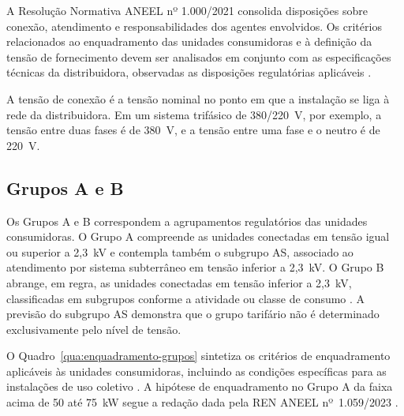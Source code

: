 A Resolução Normativa ANEEL nº 1.000/2021 consolida disposições sobre conexão, atendimento e responsabilidades dos agentes envolvidos. Os critérios relacionados ao enquadramento das unidades consumidoras e à definição da tensão de fornecimento devem ser analisados em conjunto com as especificações técnicas da distribuidora, observadas as disposições regulatórias aplicáveis \cite[arts.~23 e~24]{aneel1000}\cite[itens~7.2 e~7.3]{enel0126}\cite[item~7.8.2]{enel1580}.

A tensão de conexão é a tensão nominal no ponto em que a instalação se liga à rede da distribuidora. Em um sistema trifásico de 380/220~V, por exemplo, a tensão entre duas fases é de 380~V, e a tensão entre uma fase e o neutro é de 220~V.

\subsection{Grupos A e B}

Os Grupos A e B correspondem a agrupamentos regulatórios das unidades consumidoras. O Grupo A compreende as unidades conectadas em tensão igual ou superior a 2,3~kV e contempla também o subgrupo AS, associado ao atendimento por sistema subterrâneo em tensão inferior a 2,3~kV. O Grupo B abrange, em regra, as unidades conectadas em tensão inferior a 2,3~kV, classificadas em subgrupos conforme a atividade ou classe de consumo \cite[art.~2º, incisos XXIII e XXIV]{aneel1000}. A previsão do subgrupo AS demonstra que o grupo tarifário não é determinado exclusivamente pelo nível de tensão.

O Quadro~\ref{qua:enquadramento-grupos} sintetiza os critérios de enquadramento aplicáveis às unidades consumidoras, incluindo as condições específicas para as instalações de uso coletivo \cite[art.~23]{aneel1000}. A hipótese de enquadramento no Grupo A da faixa acima de 50 até 75~kW segue a redação dada pela REN ANEEL nº~1.059/2023 \cite{aneel1059}.

